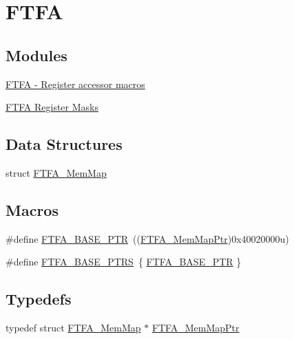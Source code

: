 \hypertarget{group___f_t_f_a___peripheral}{}\section{F\+T\+F\+A}
\label{group___f_t_f_a___peripheral}
\subsection*{Modules}
\begin{DoxyCompactItemize}
\item 
\hyperlink{group___f_t_f_a___register___accessor___macros}{F\+T\+F\+A -\/ Register accessor macros}
\item 
\hyperlink{group___f_t_f_a___register___masks}{F\+T\+F\+A Register Masks}
\end{DoxyCompactItemize}
\subsection*{Data Structures}
\begin{DoxyCompactItemize}
\item 
struct \hyperlink{struct_f_t_f_a___mem_map}{F\+T\+F\+A\+\_\+\+Mem\+Map}
\end{DoxyCompactItemize}
\subsection*{Macros}
\begin{DoxyCompactItemize}
\item 
\#define \hyperlink{group___f_t_f_a___peripheral_ga13ad52f12d5b04e5e01f69ab18ed9216}{F\+T\+F\+A\+\_\+\+B\+A\+S\+E\+\_\+\+P\+T\+R}~((\hyperlink{group___f_t_f_a___peripheral_ga49d048bbeb55a090a5ecfe86ff767884}{F\+T\+F\+A\+\_\+\+Mem\+Map\+Ptr})0x40020000u)
\item 
\#define \hyperlink{group___f_t_f_a___peripheral_ga3f06770a713a2c02c4eec6b98daefd7e}{F\+T\+F\+A\+\_\+\+B\+A\+S\+E\+\_\+\+P\+T\+R\+S}~\{ \hyperlink{group___f_t_f_a___peripheral_ga13ad52f12d5b04e5e01f69ab18ed9216}{F\+T\+F\+A\+\_\+\+B\+A\+S\+E\+\_\+\+P\+T\+R} \}
\end{DoxyCompactItemize}
\subsection*{Typedefs}
\begin{DoxyCompactItemize}
\item 
typedef struct \hyperlink{struct_f_t_f_a___mem_map}{F\+T\+F\+A\+\_\+\+Mem\+Map} $\ast$ \hyperlink{group___f_t_f_a___peripheral_ga49d048bbeb55a090a5ecfe86ff767884}{F\+T\+F\+A\+\_\+\+Mem\+Map\+Ptr}
\end{DoxyCompactItemize}


